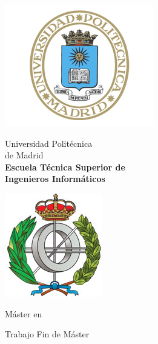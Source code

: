 \begin{titlepage}

\begin{minipage}{0.15\linewidth}
\hspace*{-2.5cm}
\noindent
\includegraphics[scale=0.5]{include/EscUpm.png} \qquad\qquad
\end{minipage}
\begin{minipage}{0.7\linewidth}
\begin{center}
\huge{ Universidad Politécnica\\de Madrid }\\
\vspace*{0.5cm}
\Large{\textbf{Escuela Técnica Superior de \\
Ingenieros Informáticos}}
\end{center}
\end{minipage}
\begin{minipage}{0.2\linewidth}
\includegraphics[scale=0.5]{include/FacInformatica.png} 
\end{minipage}

\vspace*{1cm}
\begin{center}
\Large{Máster en  \Master{} }
\end{center}

\vspace*{1cm}
\begin{center}
\huge{ Trabajo Fin de Máster }
\end{center}


\end{titlepage}
